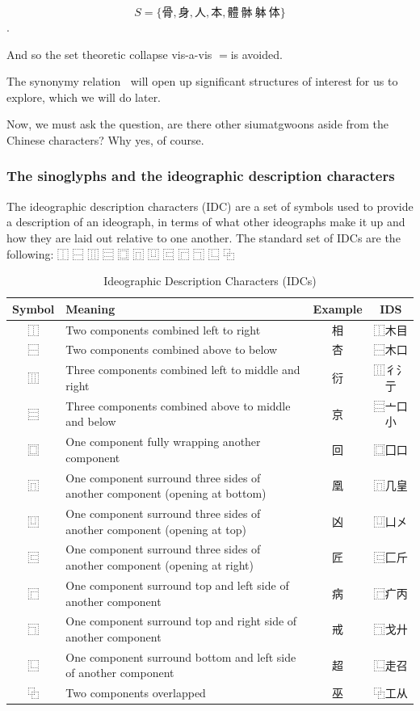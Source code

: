 $$S=\{\text{骨}, \text{身}, \text{人}, \text{本}, \text{體} ~ \text{骵} ~\text{躰} ~\text{体}\}$$.

And so the set theoretic collapse vis-a-vis $=$is avoided. 

The synonymy relation $~$ will open up significant structures of interest for us to explore, which we will do later.

Now, we must ask the question, are there other siumatgwoons aside from the Chinese characters? Why yes, of course. 

\subsubsection{The sinoglyphs and the ideographic description characters}

The ideographic description characters (IDC) are a set of symbols used to provide a description of an ideograph, in terms of what other ideographs make it up and how they are laid out relative to one another. The standard set of IDCs are the following:
⿰	⿱	⿲	⿳	⿴	⿵	⿶	⿷	⿸	⿹	⿺	⿻	

\begin{table}[H]
\centering
\caption{Ideographic Description Characters (IDCs)}
\label{tab:idc}
\begin{tabular}{|c|p{4cm}|c|c|}
\hline
\textbf{Symbol} & \textbf{Meaning} & \textbf{Example} & \textbf{IDS} \\
\hline
⿰ & Two components combined left to right & 相 & ⿰木目 \\
\hline
⿱ & Two components combined above to below & 杏 & ⿱木口 \\
\hline
⿲ & Three components combined left to middle and right & 衍 & ⿲彳氵亍 \\
\hline
⿳ & Three components combined above to middle and below & 京 & ⿳亠口小 \\
\hline
⿴ & One component fully wrapping another component & 回 & ⿴囗口 \\
\hline
⿵ & One component surround three sides of another component (opening at bottom) & 凰 & ⿵几皇 \\
\hline
⿶ & One component surround three sides of another component (opening at top) & 凶 & ⿶凵㐅 \\
\hline
⿷ & One component surround three sides of another component (opening at right) & 匠 & ⿷匚斤 \\
\hline
⿸ & One component surround top and left side of another component & 病 & ⿸疒丙 \\
\hline
⿹ & One component surround top and right side of another component & 戒 & ⿹戈廾 \\
\hline
⿺ & One component surround bottom and left side of another component & 超 & ⿺走召 \\
\hline
⿻ & Two components overlapped & 巫 & ⿻工从 \\
\hline
\end{tabular}
\end{table}

